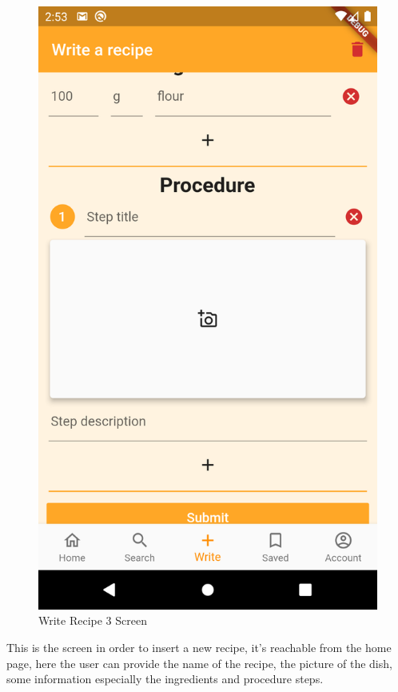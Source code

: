\begin{figure}[H]
\begin{minipage}{0.31\textwidth}
		\includegraphics{img/Write_3.png}
		\caption{Write Recipe 3 Screen}
	\end{minipage}
\end{figure}
This is the screen in order to insert a new recipe, it's reachable from the home page, here the user can provide the name of the recipe, the picture of the dish, some information especially the ingredients and procedure steps.
